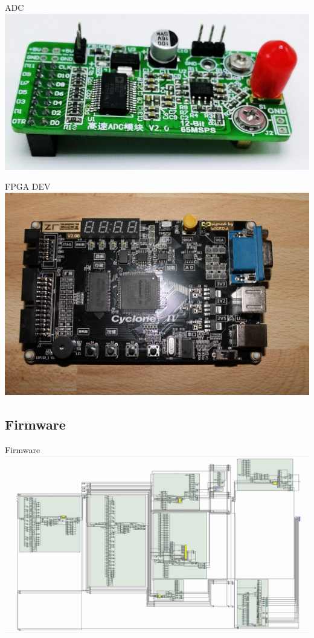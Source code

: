 \documentclass{beamer}
\begin{document}
	\begin{frame}{ADC}
		\includegraphics[width=\paperwidth]{adc_board.jpg}
	\end{frame}
	
		\begin{frame}{FPGA DEV}
		\includegraphics[width=\paperwidth]{ZRtech_board.jpg}
	\end{frame}
	
	
	\subsection{Firmware}
		\begin{frame}{Firmware}
			\includegraphics[width=\paperwidth]{rtl_fake.png}
		\end{frame}
\end{document}
